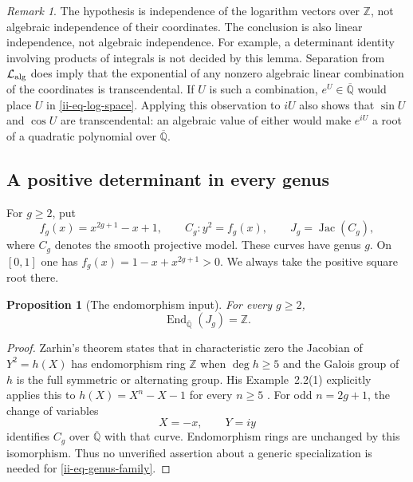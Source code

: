 \documentclass[11pt,a4paper]{article}
\newtheorem{proposition}[theorem]{Proposition}
\theoremstyle{definition}
\theoremstyle{remark}
\newtheorem{remark}[theorem]{Remark}
\numberwithin{equation}{section}
\newcommand{\Qbar}{\overline{\mathbb Q}}
\begin{document}
\begin{remark}\label{ii-rem-limits}
The hypothesis is independence of the logarithm vectors over
$\mathbb Z$, not algebraic independence of their coordinates.  The
conclusion is also linear independence, not algebraic independence.
For example, a determinant identity involving products of integrals is
not decided by this lemma.  Separation from
$\mathcal L_{\rm alg}$ does imply that the exponential of any nonzero
algebraic linear combination of the coordinates is transcendental.
If $U$ is such a combination, $e^U\in\Qbar$ would place
$U$ in \eqref{ii-eq-log-space}.  Applying this observation to $iU$ also
shows that $\sin U$ and $\cos U$ are transcendental: an algebraic value
of either would make $e^{iU}$ a root of a quadratic polynomial over
$\Qbar$.
\end{remark}

\subsection{A positive determinant in every genus}

For $g\ge2$, put
\begin{equation}\label{ii-eq-genus-family}
 f_g(x)=x^{2g+1}-x+1,\qquad
 C_g:y^2=f_g(x),\qquad J_g=\operatorname{Jac}(C_g),
\end{equation}
where $C_g$ denotes the smooth projective model.  These curves have genus
$g$.  On $[0,1]$ one has $f_g(x)=1-x+x^{2g+1}>0$.  We always take the
positive square root there.

\begin{proposition}[The endomorphism input]
\label{ii-prop-endomorphisms}
For every $g\ge2$,
\[
 \operatorname{End}_{\Qbar}(J_g)=\mathbb Z.
\]
\end{proposition}
\begin{proof}
Zarhin's theorem states that in characteristic zero the Jacobian of
$Y^2=h(X)$ has endomorphism ring $\mathbb Z$ when $\deg h\ge5$ and
the Galois group of $h$ is the full symmetric or alternating group.
His Example~2.2(1) explicitly applies this to
$h(X)=X^n-X-1$ for every $n\ge5$
\cite[Theorem~2.1 and Example~2.2(1)]{dd-Zarhin2000}.
For odd $n=2g+1$, the change of variables
\[
 X=-x,\qquad Y=iy
\]
identifies $C_g$ over $\Qbar$ with that curve.  Endomorphism rings are
unchanged by this isomorphism.  Thus no unverified assertion about a
generic specialization is needed for \eqref{ii-eq-genus-family}.
\end{proof}
\end{document}
